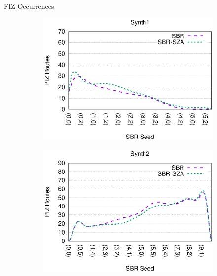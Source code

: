 \begin{frame}{FIZ Occurrences}
	\begin{center}
		\begin{figure}
			\begin{subfigure}{0.49\linewidth}
				\includegraphics[width=1.0\linewidth]{charts/synth1/synth1-piz-routes-bezier.eps}
			\end{subfigure}
			\begin{subfigure}{0.49\linewidth}
				\includegraphics[width=1.0\linewidth]{charts/synth2/synth2-piz-routes-bezier.eps}
			\end{subfigure}
			\begin{subfigure}{0.49\linewidth}

\end{subfigure}
\end{figure}
\end{center}
\end{frame}
